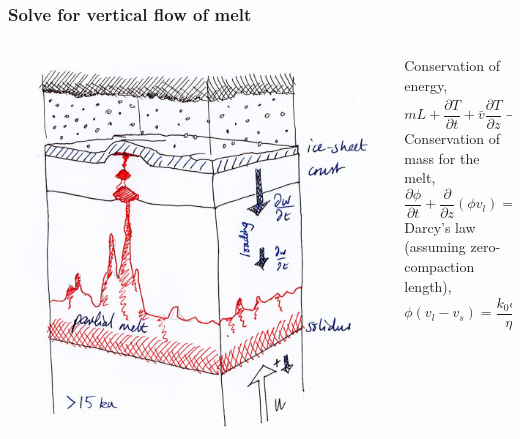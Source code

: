 \documentclass[aspectratio=169]{beamer}
\begin{document}
\begin{frame}
    \frametitle{Solve for vertical flow of melt}
    \begin{columns}
        \begin{column}{0.5\textwidth}
            \includegraphics[width=.45\paperwidth]{./figures/sketch1a.png}
        \end{column}
        \begin{column}{0.5\textwidth}
            Conservation of energy,\newline
            \[
            mL + \frac{\partial T}{\partial t} + \bar{v}\frac{\partial T}{\partial z} - \kappa\frac{\partial^{2} T}{\partial z^{2}} = 0.
            \]
            Conservation of mass for the melt,\newline
            \[
            \frac{\partial\phi}{\partial t} + \frac{\partial}{\partial z}\left(\phi v_{l}\right) = m.
            \]
            Darcy's law (assuming zero-compaction length),\newline
            \[
            \phi\left(v_{l}-v_{s}\right) = \frac{k_{0}\phi^{n}}{\eta_{l}}\Delta\rho g.
            \]
        \end{column}
    \end{columns}
\end{frame}
\end{document}
